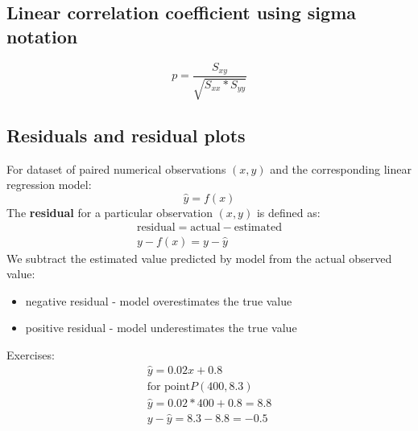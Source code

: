 \documentclass{article}
\begin{document}
\subsection{Linear correlation coefficient using sigma notation}
\begin{equation}
  p = \frac{S_{xy}}{\sqrt{S_{xx} * S_{yy}}}
\end{equation}
\subsection{Residuals and residual plots}
For dataset of paired numerical observations $(x, y)$ and the corresponding
linear regression model:
\begin{equation}
  \hat y = f(x)
\end{equation}
The \textbf{residual} for a particular observation $(x, y)$ is defined as:
\begin{equation}
  \begin{gathered}
    \text{residual} = \text{actual} - \text{estimated} \\
    y - f(x) = y - \hat y
  \end{gathered}
\end{equation}
We subtract the estimated value predicted by model from the actual observed
value:
\begin{itemize}
\item negative residual - model overestimates the true value
\item positive residual - model underestimates the true value
\end{itemize}

Exercises:
\begin{equation}
  \begin{gathered}
    \hat y = 0.02x + 0.8 \\
    \text{for point} P(400, 8.3) \\
    \hat y = 0.02 * 400 + 0.8 = 8.8 \\
    y - \hat y = 8.3 - 8.8 = -0.5
  \end{gathered}
\end{equation}
\end{document}
